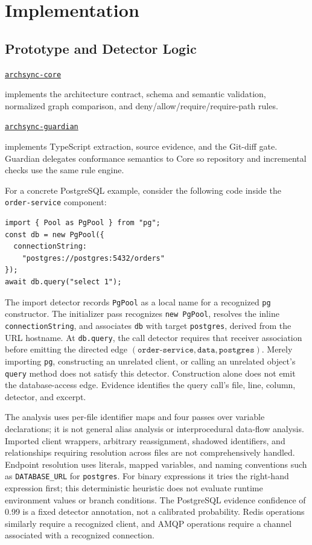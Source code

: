 \documentclass[conference]{IEEEtran}
\newif\ifarchsyncanonymous
\newcommand{\archsyncrepository}[2]{%
  \ifarchsyncanonymous
    \nolinkurl{#1} (blinded)%
  \else
    \href{#2}{\nolinkurl{#1}}%
  \fi
}
\begin{document}
\section{Implementation}

\subsection{Prototype and Detector Logic}

\archsyncrepository{archsync-core}{https://github.com/Little-Boy-s-ArchSync/archsync-core} implements the architecture contract, schema and semantic validation, normalized graph comparison, and deny/allow/require/require-path rules. \archsyncrepository{archsync-guardian}{https://github.com/Little-Boy-s-ArchSync/archsync-guardian} implements TypeScript extraction, source evidence, and the Git-diff gate. Guardian delegates conformance semantics to Core so repository and incremental checks use the same rule engine.

For a concrete PostgreSQL example, consider the following code inside the \texttt{order-service} component:
\begin{verbatim}
import { Pool as PgPool } from "pg";
const db = new PgPool({
  connectionString:
    "postgres://postgres:5432/orders"
});
await db.query("select 1");
\end{verbatim}
The import detector records \texttt{PgPool} as a local name for a recognized \texttt{pg} constructor. The initializer pass recognizes \texttt{new PgPool}, resolves the inline \texttt{connectionString}, and associates \texttt{db} with target \texttt{postgres}, derived from the URL hostname. At \texttt{db.query}, the call detector requires that receiver association before emitting the directed edge $(\texttt{order-service},\texttt{data},\texttt{postgres})$. Merely importing \texttt{pg}, constructing an unrelated client, or calling an unrelated object's \texttt{query} method does not satisfy this detector. Construction alone does not emit the database-access edge. Evidence identifies the query call's file, line, column, detector, and excerpt.

The analysis uses per-file identifier maps and four passes over variable declarations; it is not general alias analysis or interprocedural data-flow analysis. Imported client wrappers, arbitrary reassignment, shadowed identifiers, and relationships requiring resolution across files are not comprehensively handled. Endpoint resolution uses literals, mapped variables, and naming conventions such as \texttt{DATABASE\_URL} for \texttt{postgres}. For binary expressions it tries the right-hand expression first; this deterministic heuristic does not evaluate runtime environment values or branch conditions. The PostgreSQL evidence confidence of 0.99 is a fixed detector annotation, not a calibrated probability. Redis operations similarly require a recognized client, and AMQP operations require a channel associated with a recognized connection.
\end{document}
